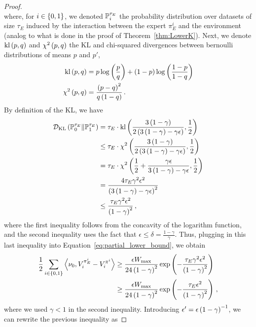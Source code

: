 \begin{proof}
\begin{equation*}
    \end{equation*}
    where, for $i \in \left\{ 0, 1 \right\}$, we denoted $\mathbb{P}_i^{\tau_E}$ the probability distribution over datasets of size $\tau_E$ induced by the interaction between the expert $\pi_E^i$ and the environment (analog to what is done in the proof of Theorem~\ref{thm:LowerK}). Next, we denote $\operatorname{kl} \left( p, q \right)$ and $\chi^2 \left( p, q \right)$ the KL and chi-squared divergences between bernoulli distributions of means $p$ and $p'$, \ie
    \begin{align*}
        \operatorname{kl} \left( p, q \right) &= p \log \left( \frac{p}{q} \right) + \left( 1 - p \right) \log \left( \frac{1 - p}{1 - q} \right) \\
        \chi^2 \left( p, q \right) &= \frac{\left( p - q \right)^2}{q \left( 1 - q \right)}\,.
    \end{align*}
    By definition of the KL, we have
    \begin{align*}
        \mathcal{D}_{\text{KL}} \left( \mathbb{P}_0^{\tau_E} \| \mathbb{P}_1^{\tau_E} \right) &= \tau_E \cdot \operatorname{kl} \left( \frac{3 \left( 1 - \gamma \right)}{2 \left( 3 \left( 1 - \gamma \right) - \gamma \epsilon \right)}, \frac12 \right) \\
        &\leq \tau_E \cdot \chi^2 \left( \frac{3 \left( 1 - \gamma \right)}{2 \left( 3 \left( 1 - \gamma \right) - \gamma \epsilon \right)}, \frac12 \right) \\
        &= \tau_E \cdot \chi^2 \left( \frac12 + \frac{\gamma \epsilon}{3 \left( 1 - \gamma \right) - \gamma \epsilon}, \frac12 \right) \\
        &= \frac{4 \tau_E \gamma^2 \epsilon^2}{\left( 3 \left( 1 - \gamma \right) - \gamma \epsilon \right)^2} \\
        &\leq \frac{\tau_E \gamma^2 \epsilon^2}{\left( 1 - \gamma \right)^2}\,,
    \end{align*}
    where the first inequality follows from the concavity of the logarithm function, and the second inequality uses the fact that $\epsilon \leq \delta = \frac{1-\gamma}{\gamma}$. Thus, plugging in this last inequality into Equation~\eqref{eq:partial_lower_bound}, we obtain
    \begin{align*}
        \frac12 \sum_{i \in \left\{ 0, 1 \right\}} \left\langle \nu_0, V_i^{\pi_E^i} - V_i^{\bar\pi^i} \right\rangle &\geq \frac{\epsilon W_{\max}}{24 \left( 1 - \gamma \right)^2} \exp \left( - \frac{\tau_E \gamma^2 \epsilon^2}{\left( 1 - \gamma \right)^2} \right) \\
        &\geq \frac{\epsilon W_{\max}}{24 \left( 1 - \gamma \right)^2} \exp \left( - \frac{\tau_E \epsilon^2}{\left( 1 - \gamma \right)^2} \right)\,,
    \end{align*}
    where we used $\gamma < 1$ in the second inequality. Introducing $\epsilon' = \epsilon \left( 1 - \gamma \right)^{-1}$, we can rewrite the previous inequality as

\end{proof}
